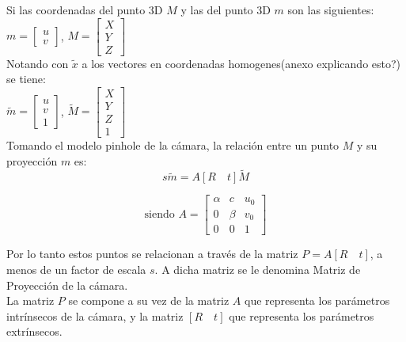 Si las coordenadas del punto 3D $M$ y las del punto 3D $m$ son las siguientes:\\

 $m = \begin{bmatrix}
u \\ 
v
\end{bmatrix} $, \-
$M = \begin{bmatrix}
X \\ 
Y \\
Z
\end{bmatrix} $\\

Notando con $\tilde{x}$ a los vectores en coordenadas homogenes(anexo explicando esto?) se tiene:\\

$\tilde{m} = \begin{bmatrix}
u \\ 
v \\
1
\end{bmatrix} $, \-
$\tilde{M} = \begin{bmatrix}
X \\ 
Y \\
Z \\
1
\end{bmatrix} $\\

Tomando el modelo pinhole de la cámara, la relación entre un punto $M$ y su proyección $m$ es:
\begin{equation}
s\tilde{m} = A [R \quad t]\tilde{M}
\label{proyeccion}
\end{equation}




\begin{equation}
\text{siendo }
A = \begin{bmatrix}
\alpha & c & u_0 \\ 
0 & \beta & v_0 \\ 
0 & 0 & 1
\end{bmatrix} 
\end{equation}

Por lo tanto estos puntos se relacionan a través de la matriz $P = A [R \quad t]$, a menos de un factor de escala $s$. A dicha matriz  se le denomina Matriz de Proyección de la cámara.\\

La matriz $P$ se compone a su vez de la matriz $A$ que representa los parámetros intrínsecos de la cámara, y la matriz $[R \quad t]$ que representa los parámetros extrínsecos.\\

